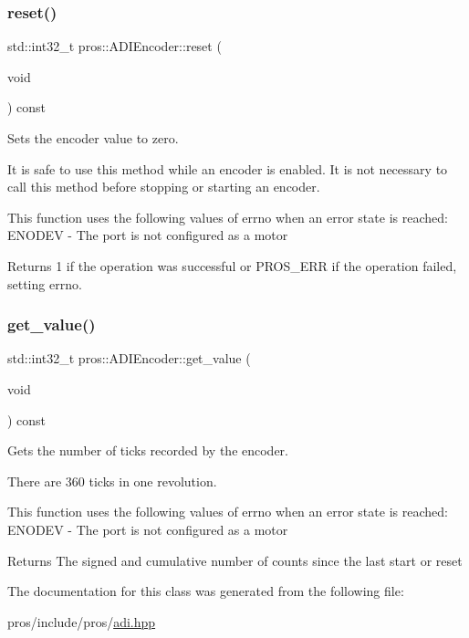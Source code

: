 \subsubsection{\texorpdfstring{reset()}{reset()}}
{\footnotesize\ttfamily std\+::int32\+\_\+t pros\+::\+A\+D\+I\+Encoder\+::reset (\begin{DoxyParamCaption}\item[{void}]{ }\end{DoxyParamCaption}) const}



Sets the encoder value to zero. 

It is safe to use this method while an encoder is enabled. It is not necessary to call this method before stopping or starting an encoder.

This function uses the following values of errno when an error state is reached\+: E\+N\+O\+D\+EV -\/ The port is not configured as a motor

\begin{DoxyReturn}{Returns}
1 if the operation was successful or P\+R\+O\+S\+\_\+\+E\+RR if the operation failed, setting errno. 
\end{DoxyReturn}
\mbox{\label{classpros_1_1ADIEncoder_acb4c087c7318028db25ae39dabb64700}} 
\subsubsection{\texorpdfstring{get\+\_\+value()}{get\_value()}}
{\footnotesize\ttfamily std\+::int32\+\_\+t pros\+::\+A\+D\+I\+Encoder\+::get\+\_\+value (\begin{DoxyParamCaption}\item[{void}]{ }\end{DoxyParamCaption}) const}



Gets the number of ticks recorded by the encoder. 

There are 360 ticks in one revolution.

This function uses the following values of errno when an error state is reached\+: E\+N\+O\+D\+EV -\/ The port is not configured as a motor

\begin{DoxyReturn}{Returns}
The signed and cumulative number of counts since the last start or reset 
\end{DoxyReturn}


The documentation for this class was generated from the following file\+:\begin{DoxyCompactItemize}
\item 
pros/include/pros/\hyperlink{adi_8hpp}{adi.\+hpp}\end{DoxyCompactItemize}
